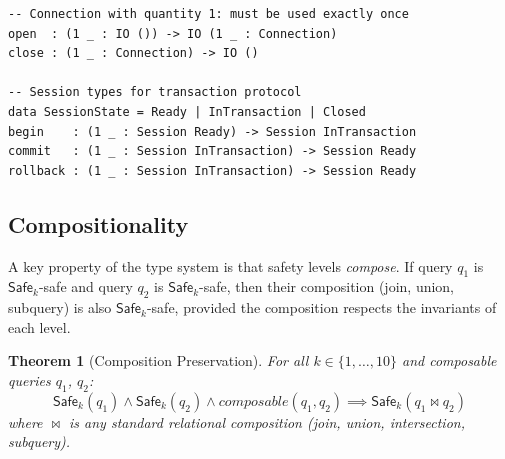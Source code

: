 \documentclass[11pt,a4paper]{article}
\newtheorem{theorem}{Theorem}[section]
\newcommand{\Safe}[1]{\ensuremath{\mathsf{Safe}_{#1}}}
\begin{document}
\begin{lstlisting}[language=Idris2]
-- Connection with quantity 1: must be used exactly once
open  : (1 _ : IO ()) -> IO (1 _ : Connection)
close : (1 _ : Connection) -> IO ()

-- Session types for transaction protocol
data SessionState = Ready | InTransaction | Closed
begin    : (1 _ : Session Ready) -> Session InTransaction
commit   : (1 _ : Session InTransaction) -> Session Ready
rollback : (1 _ : Session InTransaction) -> Session Ready
\end{lstlisting}

\subsection{Compositionality}

A key property of the type system is that safety levels \emph{compose}.
If query $q_1$ is \Safe{k}-safe and query $q_2$ is \Safe{k}-safe,
then their composition (join, union, subquery) is also \Safe{k}-safe,
provided the composition respects the invariants of each level.

\begin{theorem}[Composition Preservation]
For all $k \in \{1, \ldots, 10\}$ and composable queries $q_1$, $q_2$:
\[
  \Safe{k}(q_1) \land \Safe{k}(q_2) \land \mathit{composable}(q_1, q_2)
  \implies \Safe{k}(q_1 \bowtie q_2)
\]
where $\bowtie$ is any standard relational composition (join, union,
intersection, subquery).
\end{theorem}
\end{document}
